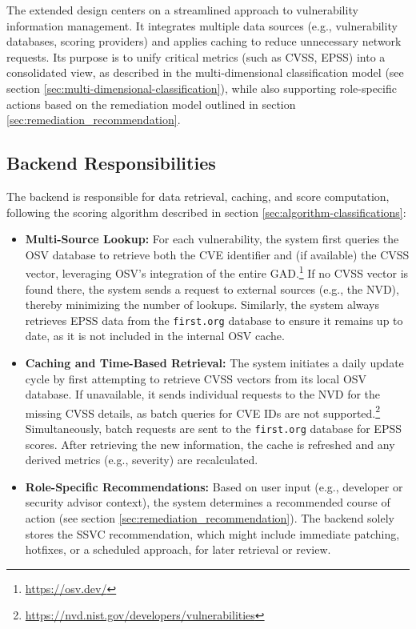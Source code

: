 The extended design centers on a streamlined approach to vulnerability information management. It integrates multiple data sources (e.g., vulnerability databases, scoring providers) and applies caching to reduce unnecessary network requests. Its purpose is to unify critical metrics (such as \ac{CVSS}, \ac{EPSS}) into a consolidated view, as described in the multi-dimensional classification model (see section \ref{sec:multi-dimensional-classification}), while also supporting role-specific actions based on the remediation model outlined in section \ref{sec:remediation_recommendation}.

\subsection{Backend Responsibilities}
\label{subsec:backend-responsibilities}

The backend is responsible for data retrieval, caching, and score computation, following the scoring algorithm described in section \ref{sec:algorithm-classifications}:
\begin{itemize}
    \item \textbf{Multi-Source Lookup:}  
    For each vulnerability, the system first queries the \ac{OSV} database to retrieve both the \ac{CVE} identifier and (if available) the \ac{CVSS} vector, leveraging \ac{OSV}'s integration of the entire \ac{GAD}.\footnote{\url{https://osv.dev/}} If no \ac{CVSS} vector is found there, the system sends a request to external sources (e.g., the \ac{NVD}), thereby minimizing the number of lookups. Similarly, the system always retrieves \ac{EPSS} data from the \texttt{first.org} database to ensure it remains up to date, as it is not included in the internal \ac{OSV} cache.
    \item \textbf{Caching and Time-Based Retrieval:}  
    The system initiates a daily update cycle by first attempting to retrieve \ac{CVSS} vectors from its local \ac{OSV} database. If unavailable, it sends individual requests to the \ac{NVD} for the missing \ac{CVSS} details, as batch queries for \ac{CVE} IDs are not supported.\footnote{\url{https://nvd.nist.gov/developers/vulnerabilities}} Simultaneously, batch requests are sent to the \texttt{first.org} database for \ac{EPSS} scores.
    After retrieving the new information, the cache is refreshed and any derived metrics (e.g., severity) are recalculated.
    \item \textbf{Role-Specific Recommendations:} Based on user input (e.g., developer or security advisor context), the system determines a recommended course of action (see section \ref{sec:remediation_recommendation}). The backend solely stores the \ac{SSVC} recommendation, which might include immediate patching, hotfixes, or a scheduled approach, for later retrieval or review.
\end{itemize}

